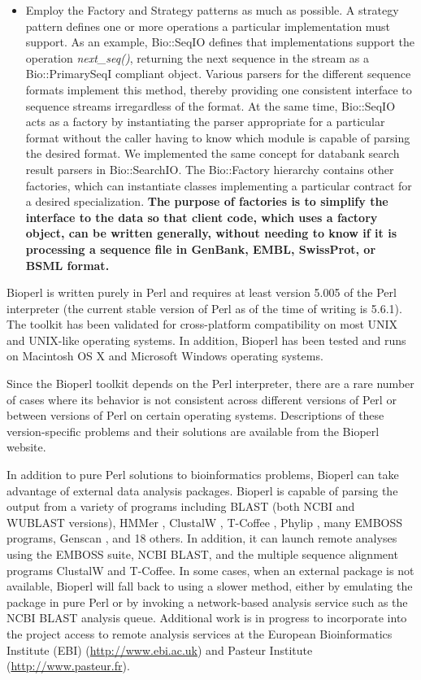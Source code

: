 \documentclass[12pt]{article}
\begin{document}
\begin{itemize}
\item Employ the Factory and Strategy patterns \cite{gangoffour} as
much as possible. A strategy pattern defines one or more operations a
particular implementation must support. As an example, Bio::SeqIO
defines that implementations support the operation
\textit{next\_seq()}, returning the next sequence in the stream as a
Bio::PrimarySeqI compliant object. Various parsers for the different
sequence formats implement this method, thereby providing one
consistent interface to sequence streams irregardless of the format.
At the same time, Bio::SeqIO acts as a factory by instantiating the
parser appropriate for a particular format without the caller having
to know which module is capable of parsing the desired format. We
implemented the same concept for databank search result parsers in
Bio::SearchIO. The Bio::Factory hierarchy contains other factories,
which can instantiate classes implementing a particular contract for a
desired specialization.  \textbf{The purpose of factories is to simplify the
interface to the data so that client code, which uses a factory
object, can be written generally, without needing to know if it is
processing a sequence file in GenBank, EMBL, SwissProt, or BSML
format.}

\end{itemize}


Bioperl is written purely in Perl and requires at least version 5.005
of the Perl interpreter (the current stable version of Perl as of the
time of writing is 5.6.1).  The toolkit has been validated for
cross-platform compatibility on most UNIX and UNIX-like operating
systems.  In addition, Bioperl has been tested and runs on Macintosh
OS X and Microsoft Windows operating systems.  

Since the Bioperl toolkit depends on the Perl interpreter, there are a
rare number of cases where its behavior is not consistent across
different versions of Perl or between versions of Perl on certain
operating systems.  Descriptions of these version-specific problems
and their solutions are available from the Bioperl website.

In addition to pure Perl solutions to bioinformatics problems, Bioperl
can take advantage of external data analysis packages.  Bioperl is
capable of parsing the output from a variety of programs including BLAST (both
NCBI and WUBLAST \cite{wublast} versions), HMMer \cite{hmmer}, 
ClustalW \cite{clustalw}, T-Coffee \cite{tcoffee}, 
Phylip \cite{phylip}, many EMBOSS \cite{emboss} programs, 
Genscan \cite{genscan}, and 18 others.
In addition, it can launch remote analyses using the EMBOSS
suite, NCBI BLAST, and the multiple sequence alignment
programs ClustalW and T-Coffee.  In
some cases, when an external package is not available, Bioperl will
fall back to using a slower method, either by emulating the package in
pure Perl or by invoking a network-based analysis service such as the
NCBI BLAST analysis queue.  Additional work is in progress to
incorporate into the project access to remote analysis services at the
European Bioinformatics Institute (EBI) (\url{http://www.ebi.ac.uk}) and
Pasteur Institute (\url{http://www.pasteur.fr}).
\end{document}
